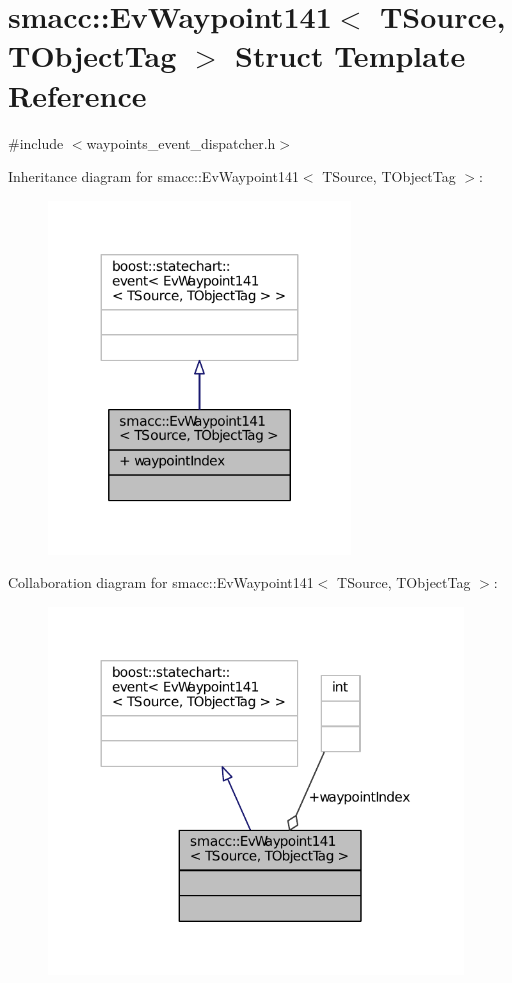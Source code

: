 \hypertarget{structsmacc_1_1EvWaypoint141}{}\section{smacc\+:\+:Ev\+Waypoint141$<$ T\+Source, T\+Object\+Tag $>$ Struct Template Reference}
\label{structsmacc_1_1EvWaypoint141}


{\ttfamily \#include $<$waypoints\+\_\+event\+\_\+dispatcher.\+h$>$}



Inheritance diagram for smacc\+:\+:Ev\+Waypoint141$<$ T\+Source, T\+Object\+Tag $>$\+:
\nopagebreak
\begin{figure}[H]
\begin{center}
\leavevmode
\includegraphics[width=227pt]{structsmacc_1_1EvWaypoint141__inherit__graph}
\end{center}
\end{figure}


Collaboration diagram for smacc\+:\+:Ev\+Waypoint141$<$ T\+Source, T\+Object\+Tag $>$\+:
\nopagebreak
\begin{figure}[H]
\begin{center}
\leavevmode
\includegraphics[width=312pt]{structsmacc_1_1EvWaypoint141__coll__graph}
\end{center}
\end{figure}
